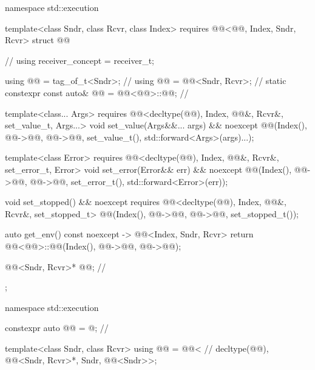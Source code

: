 \pnum
\begin{codeblock}
namespace std::execution {
  template<class Sndr, class Rcvr, class Index>
    requires @@<@@, Index, Sndr, Rcvr>
  struct @@ {                                       // \expos
    using receiver_concept = receiver_t;

    using @@ = tag_of_t<Sndr>;                               // \expos
    using @@ = @@<Sndr, Rcvr>;                     // \expos
    static constexpr const auto& @@ = @@<@@>::@@;         // \expos

    template<class... Args>
      requires @@<decltype(@@), Index, @@&, Rcvr&, set_value_t, Args...>
    void set_value(Args&&... args) && noexcept {
      @@(Index(), @@->@@, @@->@@, set_value_t(), std::forward<Args>(args)...);
    }

    template<class Error>
      requires @@<decltype(@@), Index, @@&, Rcvr&, set_error_t, Error>
    void set_error(Error&& err) && noexcept {
      @@(Index(), @@->@@, @@->@@, set_error_t(), std::forward<Error>(err));
    }

    void set_stopped() && noexcept
      requires @@<decltype(@@), Index, @@&, Rcvr&, set_stopped_t> {
      @@(Index(), @@->@@, @@->@@, set_stopped_t());
    }

    auto get_env() const noexcept -> @@<Index, Sndr, Rcvr> {
      return @@<@@>::@@(Index(), @@->@@, @@->@@);
    }

    @@<Sndr, Rcvr>* @@;                                // \expos
  };
}
\end{codeblock}

\begin{codeblock}
namespace std::execution {
  constexpr auto @@ = @\seebelownc@;                       // \expos

  template<class Sndr, class Rcvr>
  using @@ = @@<                     // \expos
    decltype(@@), @@<Sndr, Rcvr>*, Sndr, @@<Sndr>>;
}
\end{codeblock}

